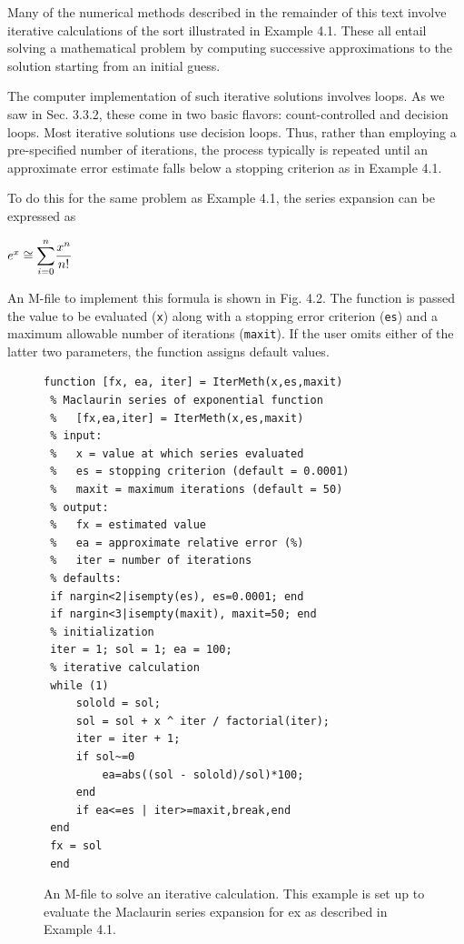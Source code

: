 \documentclass[../main.tex]{subfiles}
\begin{document}
\noindent
Many of the numerical methods described in the remainder of this text involve iterative
calculations of the sort illustrated in Example 4.1. These all entail solving a mathematical
problem by computing successive approximations to the solution starting from an initial
guess.

The computer implementation of such iterative solutions involves loops. As we saw in
Sec. 3.3.2, these come in two basic flavors: count-controlled and decision loops. Most iterative
solutions use decision loops. Thus, rather than employing a pre-specified number of
iterations, the process typically is repeated until an approximate error estimate falls below
a stopping criterion as in Example 4.1.

To do this for the same problem as Example 4.1, the series expansion can be expressed
as
\newline

$e^x\cong \mathlarger{\sum}_{i=0}^{n}\dfrac{x^n}{n!}$
\newline

\noindent
An M-file to implement this formula is shown in Fig. 4.2. The function is passed the value
to be evaluated (\texttt{x}) along with a stopping error criterion (\texttt{es}) and a maximum allowable
number of iterations (\texttt{maxit}). If the user omits either of the latter two parameters, the function
assigns default values.
\newline

\begin{figure}[h]
    \begin{lstlisting}[numbers=none]
 function [fx, ea, iter] = IterMeth(x,es,maxit)
 % Maclaurin series of exponential function
 %   [fx,ea,iter] = IterMeth(x,es,maxit)
 % input:
 %   x = value at which series evaluated
 %   es = stopping criterion (default = 0.0001)
 %   maxit = maximum iterations (default = 50)
 % output:
 %   fx = estimated value
 %   ea = approximate relative error (%)
 %   iter = number of iterations    
 % defaults:
 if nargin<2|isempty(es), es=0.0001; end
 if nargin<3|isempty(maxit), maxit=50; end
 % initialization
 iter = 1; sol = 1; ea = 100;
 % iterative calculation
 while (1)
     solold = sol;
     sol = sol + x ^ iter / factorial(iter);
     iter = iter + 1;
     if sol~=0
         ea=abs((sol - solold)/sol)*100;
     end
     if ea<=es | iter>=maxit,break,end
 end
 fx = sol
 end
    \end{lstlisting}
    \caption{An M-file to solve an iterative calculation. This example is set up to evaluate the Maclaurin series
    expansion for ex as described in Example 4.1.}
\end{figure}
\end{document}
